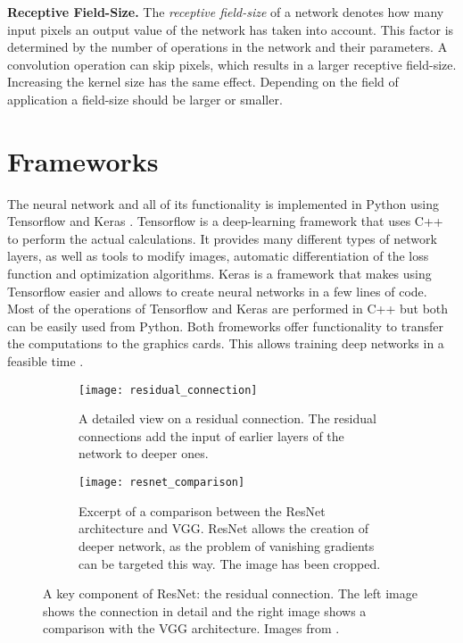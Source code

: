 \noindent\textbf{Receptive Field-Size.} The \textit{receptive field-size} of a network denotes how many input pixels an output value of the network has taken into account. This factor is determined by the number of operations in the network and their parameters. A convolution operation can skip pixels, which results in a larger receptive field-size. Increasing the kernel size has the same effect. Depending on the field of application a field-size should be larger or smaller.

\section{Frameworks}

The neural network and all of its functionality is implemented in Python using Tensorflow \cite{tensorflow} and Keras \cite{keras}. Tensorflow is a deep-learning framework that uses C++ to perform the actual calculations. It provides many different types of network layers, as well as tools to modify images, automatic differentiation of the loss function and optimization algorithms. Keras is a framework that makes using Tensorflow easier and allows to create neural networks in a few lines of code. Most of the operations of Tensorflow and Keras are performed in C++ but both can be easily used from Python. Both fromeworks offer functionality to transfer the computations to the graphics cards. This allows training deep networks in a feasible time \cite{ylecun}.

\begin{figure}[!tbp]
	\centering
	\begin{subfigure}[t]{0.47\textwidth}
		\centering
    	\texttt{[image: residual\_connection]}
    	\caption{A detailed view on a residual connection. The residual connections add the input of earlier layers of the network to deeper ones.}
    	\label{fig:residual_connection}
	\end{subfigure}
	\hfill
	\begin{subfigure}[t]{0.47\textwidth}
		\centering
    	\texttt{[image: resnet\_comparison]}
    	\caption{Excerpt of a comparison between the ResNet architecture and VGG. ResNet allows the creation of deeper network, as the problem of vanishing gradients can be targeted this way. The image has been cropped.}
    	\label{fig:resnet_comparison}
	\end{subfigure}
	\caption{A key component of ResNet: the residual connection. The left image shows the connection in detail and the right image shows a comparison with the VGG architecture. Images from \cite{resnet}.}
	\label{fig:resnet_details}
\end{figure} 

